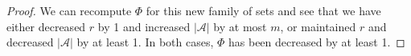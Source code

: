 \documentclass[12pt]{article}
\theoremstyle{plain}
\theoremstyle{definition}
\theoremstyle{remark}
\newcommand{\F}{\mathcal{F}}
\newcommand{\A}{\mathcal{A}}
\newcommand{\B}{\mathcal{B}}
\begin{document}
\begin{proof}

We can recompute $\Phi$ for this new family of sets and see that we have either decreased $r$ by 1 and increased $|\A|$ by at most $m$, or maintained $r$ and decreased $|\A|$ by at least 1. In both cases, $\Phi$ has been decreased by at least 1.

\end{proof}
\end{document}
